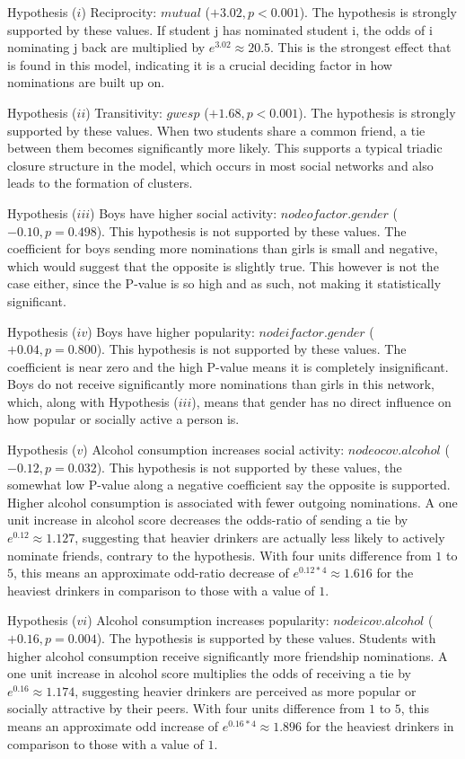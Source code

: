 \documentclass[
]{article}
\begin{document}
Hypothesis (\(i\)) Reciprocity: \(mutual\) (\(+3.02, p < 0.001\)). The
hypothesis is strongly supported by these values. If student j has
nominated student i, the odds of i nominating j back are multiplied by
\(e^{3.02} ≈ 20.5\). This is the strongest effect that is found in this
model, indicating it is a crucial deciding factor in how nominations are
built up on.

Hypothesis (\(ii\)) Transitivity: \(gwesp\) (\(+1.68, p < 0.001\)). The
hypothesis is strongly supported by these values. When two students
share a common friend, a tie between them becomes significantly more
likely. This supports a typical triadic closure structure in the model,
which occurs in most social networks and also leads to the formation of
clusters.

Hypothesis (\(iii\)) Boys have higher social activity:
\(nodeofactor.gender\) (\(−0.10, p = 0.498\)). This hypothesis is not
supported by these values. The coefficient for boys sending more
nominations than girls is small and negative, which would suggest that
the opposite is slightly true. This however is not the case either,
since the P-value is so high and as such, not making it statistically
significant.

Hypothesis (\(iv\)) Boys have higher popularity: \(nodeifactor.gender\)
(\(+0.04, p = 0.800\)). This hypothesis is not supported by these
values. The coefficient is near zero and the high P-value means it is
completely insignificant. Boys do not receive significantly more
nominations than girls in this network, which, along with Hypothesis
(\(iii\)), means that gender has no direct influence on how popular or
socially active a person is.

Hypothesis (\(v\)) Alcohol consumption increases social activity:
\(nodeocov.alcohol\) (\(−0.12, p = 0.032\)). This hypothesis is not
supported by these values, the somewhat low P-value along a negative
coefficient say the opposite is supported. Higher alcohol consumption is
associated with fewer outgoing nominations. A one unit increase in
alcohol score decreases the odds-ratio of sending a tie by
\(e^{0.12} ≈ 1.127\), suggesting that heavier drinkers are actually less
likely to actively nominate friends, contrary to the hypothesis. With
four units difference from \(1\) to \(5\), this means an approximate
odd-ratio decrease of \(e^{0.12 * 4} ≈ 1.616\) for the heaviest drinkers
in comparison to those with a value of \(1\).

Hypothesis (\(vi\)) Alcohol consumption increases popularity:
\(nodeicov.alcohol\) (\(+0.16, p = 0.004\)). The hypothesis is supported
by these values. Students with higher alcohol consumption receive
significantly more friendship nominations. A one unit increase in
alcohol score multiplies the odds of receiving a tie by
\(e^{0.16} ≈ 1.174\), suggesting heavier drinkers are perceived as more
popular or socially attractive by their peers. With four units
difference from \(1\) to \(5\), this means an approximate odd increase
of \(e^{0.16 * 4} ≈ 1.896\) for the heaviest drinkers in comparison to
those with a value of \(1\).
\end{document}
